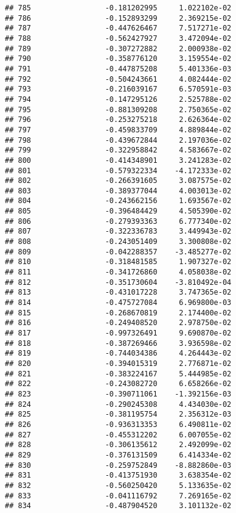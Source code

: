 \documentclass[
]{article}
\begin{document}
\begin{verbatim}
## 785                 -0.181202995     1.022102e-02
## 786                 -0.152893299     2.369215e-02
## 787                 -0.447626467     7.517271e-02
## 788                 -0.562427927     3.472094e-02
## 789                 -0.307272882     2.000938e-02
## 790                 -0.358776120     3.159554e-02
## 791                 -0.447875208     5.401336e-03
## 792                 -0.504243661     4.082444e-02
## 793                 -0.216039167     6.570591e-03
## 794                 -0.147295126     2.525788e-02
## 795                 -0.881309208     2.750365e-02
## 796                 -0.253275218     2.626364e-02
## 797                 -0.459833709     4.889844e-02
## 798                 -0.439672844     2.197036e-02
## 799                 -0.322958842     4.583667e-02
## 800                 -0.414348901     3.241283e-02
## 801                 -0.579322334    -4.172333e-02
## 802                 -0.266391605     3.087575e-02
## 803                 -0.389377044     4.003013e-02
## 804                 -0.243662156     1.693567e-02
## 805                 -0.396484429     4.505390e-02
## 806                 -0.279393363     6.777340e-02
## 807                 -0.322336783     3.449943e-02
## 808                 -0.243051409     3.300808e-02
## 809                 -0.042288357    -3.485277e-02
## 810                 -0.318481585     1.907327e-02
## 811                 -0.341726860     4.058038e-02
## 812                 -0.351730604    -3.810492e-04
## 813                 -0.431017228     3.747365e-02
## 814                 -0.475727084     6.969800e-03
## 815                 -0.268670819     2.174400e-02
## 816                 -0.249408520     2.978750e-02
## 817                 -0.997326491     9.690870e-02
## 818                 -0.387269466     3.936598e-02
## 819                 -0.744034386     4.264443e-02
## 820                 -0.394015319     2.776871e-02
## 821                 -0.383224167     5.444985e-02
## 822                 -0.243082720     6.658266e-02
## 823                 -0.390711061    -1.392156e-03
## 824                 -0.290245308     4.434030e-02
## 825                 -0.381195754     2.356312e-03
## 826                 -0.936313353     6.490811e-02
## 827                 -0.455312202     6.007055e-02
## 828                 -0.306135612     2.492099e-02
## 829                 -0.376131509     6.414334e-02
## 830                 -0.259752849    -8.882860e-03
## 831                 -0.413751930     3.638354e-02
## 832                 -0.560250420     5.133635e-02
## 833                 -0.041116792     7.269165e-02
## 834                 -0.487904520     3.101132e-02

\end{verbatim}
\end{document}
